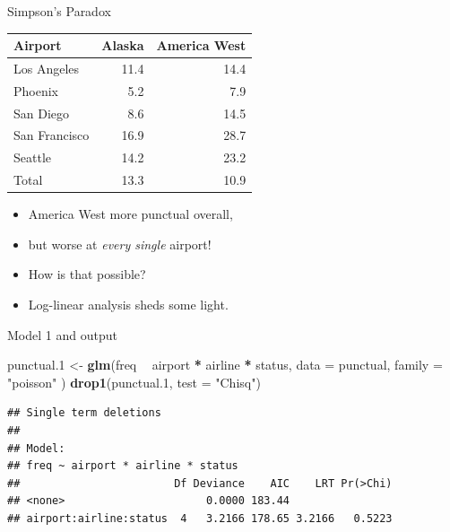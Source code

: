 \documentclass[ignorenonframetext,]{beamer}
\newenvironment{Shaded}{\begin{snugshade}}{\end{snugshade}}
\newcommand{\DataTypeTok}[1]{\textcolor[rgb]{0.13,0.29,0.53}{#1}}
\newcommand{\FloatTok}[1]{\textcolor[rgb]{0.00,0.00,0.81}{#1}}
\newcommand{\KeywordTok}[1]{\textcolor[rgb]{0.13,0.29,0.53}{\textbf{#1}}}
\newcommand{\NormalTok}[1]{#1}
\newcommand{\OperatorTok}[1]{\textcolor[rgb]{0.81,0.36,0.00}{\textbf{#1}}}
\newcommand{\StringTok}[1]{\textcolor[rgb]{0.31,0.60,0.02}{#1}}
\begin{document}
\begin{frame}{Simpson's Paradox}
\protect\hypertarget{simpsons-paradox}{}

\begin{tabular}{|l|rr|}
\hline
Airport & Alaska & America West\\
\hline
Los Angeles & 11.4 & 14.4\\
Phoenix & 5.2 & 7.9\\
San Diego & 8.6 & 14.5\\
San Francisco & 16.9 & 28.7\\
Seattle & 14.2 & 23.2 \\
\hline
Total & 13.3 & 10.9 \\
\hline
\end{tabular}

\begin{itemize}
\item
  America West more punctual overall,
\item
  but worse at \emph{every single} airport!
\item
  How is that possible?
\item
  Log-linear analysis sheds some light.
\end{itemize}

\end{frame}

\begin{frame}[fragile]{Model 1 and output}
\protect\hypertarget{model-1-and-output}{}

\begin{Shaded}
\begin{Highlighting}[]
\NormalTok{punctual}\FloatTok{.1}\NormalTok{ <-}\StringTok{ }\KeywordTok{glm}\NormalTok{(freq }\OperatorTok{~}\StringTok{ }\NormalTok{airport }\OperatorTok{*}\StringTok{ }\NormalTok{airline }\OperatorTok{*}\StringTok{ }\NormalTok{status,}
  \DataTypeTok{data =}\NormalTok{ punctual, }\DataTypeTok{family =} \StringTok{"poisson"}
\NormalTok{)}
\KeywordTok{drop1}\NormalTok{(punctual}\FloatTok{.1}\NormalTok{, }\DataTypeTok{test =} \StringTok{"Chisq"}\NormalTok{)}
\end{Highlighting}
\end{Shaded}

\begin{verbatim}
## Single term deletions
## 
## Model:
## freq ~ airport * airline * status
##                        Df Deviance    AIC    LRT Pr(>Chi)
## <none>                      0.0000 183.44                
## airport:airline:status  4   3.2166 178.65 3.2166   0.5223
\end{verbatim}

\end{frame}
\end{document}
